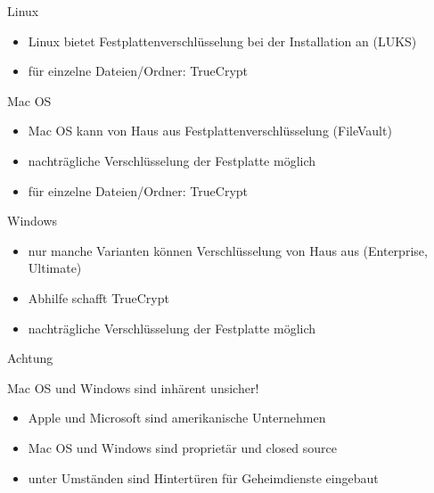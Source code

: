 \begin{frame}{Linux}
  \begin{itemize}
    \item Linux bietet Festplattenverschlüsselung bei der Installation an
      (LUKS)
    \item für einzelne Dateien/Ordner: TrueCrypt
  \end{itemize}

\end{frame}

\begin{frame}{Mac OS}
  \begin{itemize}
    \item Mac OS kann von Haus aus Festplattenverschlüsselung (FileVault)
    \item nachträgliche Verschlüsselung der Festplatte möglich
    \item für einzelne Dateien/Ordner: TrueCrypt
  \end{itemize}

\end{frame}

\begin{frame}{Windows}
  \begin{itemize}
    \item nur manche Varianten können Verschlüsselung von Haus aus (Enterprise,
      Ultimate)
    \item Abhilfe schafft TrueCrypt
    \item nachträgliche Verschlüsselung der Festplatte möglich
  \end{itemize}

\end{frame}

\begin{frame}{}
  \begin{alertblock}{Achtung}
    \centerline{Mac OS und Windows sind inhärent unsicher!}
  \end{alertblock}

  \begin{itemize}
    \item Apple und Microsoft sind amerikanische Unternehmen
    \item Mac OS und Windows sind proprietär und closed source
    \item unter Umständen sind Hintertüren für Geheimdienste eingebaut
  \end{itemize}


\end{frame}
